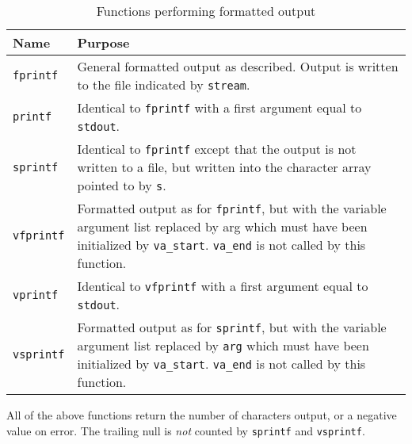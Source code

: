 \begin{table}[htb]
  \centering
  \begin{tabular}{lp{}}%
    \toprule
    Name & Purpose    \\
    \midrule

    \texttt{fprintf} & General formatted output  as  described.
                       Output  is written to the file indicated
                       by \texttt{stream}.    \\

    \texttt{printf} & Identical  to  \texttt{fprintf}  with   a   first
                      argument equal to \texttt{stdout}.
    \\
    
    \texttt{sprintf} & Identical to  \texttt{fprintf}  except  that  the
                       output  is  not  written  to a file, but
                       written into the character array pointed
                       to by \texttt{s}.
    \\

    \texttt{vfprintf} & Formatted output  as  for  \texttt{fprintf},  but
                        with the variable argument list replaced
                        by arg which must have been  initialized
                        by  \texttt{va\_start}.
                        \texttt{va\_end}  is not called by this function.
    \\

    \texttt{vprintf} & Identical  to  \texttt{vfprintf}  with  a   first
                       argument equal to \texttt{stdout}.
    \\

    \texttt{vsprintf} & Formatted output  as  for  \texttt{sprintf},  but
                        with the variable argument list replaced
                        by \texttt{arg} which must have been  initialized
                        by  \texttt{va\_start}.
                        \texttt{va\_end}  is not called by this function.
    \\
    \bottomrule
  \end{tabular}
  \caption{\label{tab:formatOut}Functions performing formatted output}
\end{table}



   All of the above functions return the number  of  characters
    output,  or a negative value on error.  The trailing null is
    \textit{not} counted by \texttt{sprintf} and \texttt{vsprintf}.


